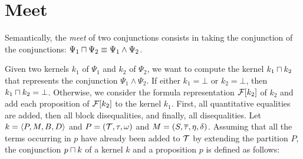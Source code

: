 \section{Meet}\label{section:meet}

Semantically, the \emph{meet} of two conjunctions consists in taking the conjunction of the conjunctions:
$\Psi_1 \sqcap \Psi_2 \equiv \Psi_1 \land \Psi_2$.

Given two kernels $k_1$ of $\Psi_1$ and $k_2$ of $\Psi_2$,
we want to compute the kernel $k_1 \sqcap k_2$ that represents the conjunction $\Psi_1 \land \Psi_2$.
If either $k_1 = \bot$ or $k_2 = \bot$, then $k_1 \sqcap k_2 = \bot$.
Otherwise, we consider the formula representation $\mathcal{F}[k_2]$ of $k_2$ and add each proposition of $\mathcal{F}[k_2]$ to the kernel $k_1$.
First, all quantitative equalities are added, then all block disequalities, and finally, all disequalities.
Let $k = \langle P,M,B,D\rangle$ and $P = (\mathcal{T}, \tau, \omega)$ and $M = (S, \overline{\tau}, \eta, \delta)$.
Assuming that all the terms occurring in $p$ have already been added to $\mathcal{T}$ by extending the partition $P$,
the conjunction $p \sqcap k$ of a kernel $k$ and a proposition $p$ is defined as follows:
